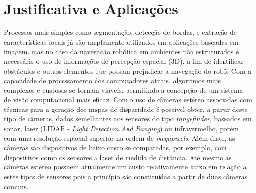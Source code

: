 \section{Justificativa e Aplicações}


Processos mais simples como segmentação, detecção de bordas, e extração de
características locais já são amplamente utilizados em aplicações baseadas em
imagem, mas no caso da navegação robótica em ambientes não estruturados é
necessário o uso de informações de percepção espacial (3D), a fim de identificar
obstáculos e outros elementos que possam prejudicar a navegação do robô.
Com a capacidade de processamento dos computadores atuais, algoritmos mais
complexos e custosos se tornam viáveis, permitindo a concepção de um sistema de
visão computacional mais eficaz. Com o uso de câmeras estéreo associadas com
técnicas para a geração dos mapas de disparidade é possível obter, a partir
deste tipo de câmeras, dados semelhantes aos sensores do tipo
\textit{rangefinder}, baseados em sonar, laser (LIDAR - \textit{Light Detection
And Ranging}) ou infravermelho, porém com uma resolução espacial superior na
ordem de \textit{megapixels}. Além disto, as câmeras são dispositivos de baixo
custo se comparadas, por exemplo, com dispositivos como os sensores a laser de
medida de distância. Até mesmo as câmeras estéreo possuem atualmente um custo
relativamente baixo em relação a estes tipos de sensores pois a princípio são
constituídas a partir de duas câmeras comuns.

